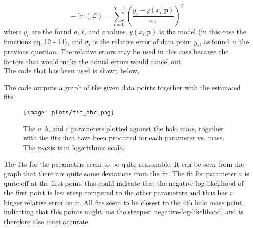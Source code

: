 \begin{equation}
-\ln(\mathcal{L}) = \sum_{i=0}^{N-1} \left(\frac{y_i - y(x_i|\mathbf{p})}{\sigma_i}\right)^2
\end{equation}
where $y_i$ are the found $a$, $b$, and $c$ values, $y(x_i|\mathbf{p})$ is the model (in this case the functions eq. 12 - 14), and $\sigma_i$ is the relative error of data point $y_i$, as found in the previous question. The relative errors may be used in this case because the factors that would make the actual errors would cancel out. \\
The code that has been used is shown below,


The code outputs a graph of the given data points together with the estimated fits.
\begin{figure}[h]
\centering
\texttt{[image: plots/fit\_abc.png]}
\caption{The $a$, $b$, and $c$ parameters plotted against the halo mass, together with the fits that have been produced for each parameter vs. mass. The x-axis is in logarithmic scale.}
\end{figure}
The fits for the parameters seem to be quite reasonable. It can be seen from the graph that there are quite some deviations from the fit. The fit for parameter $a$ is quite off at the first point, this could indicate that the negative log-likelihood of the first point is less steep compared to the other parameters and thus has a bigger relative error on it. All fits seem to be closest to the 4th halo mass point, indicating that this points might has the steepest negative-log-likelihood, and is therefore also most accurate. 